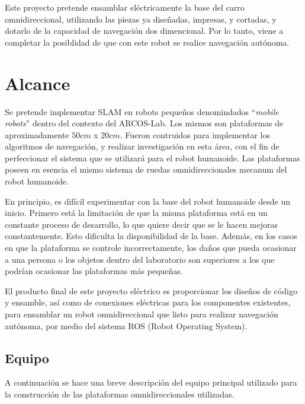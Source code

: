 Este proyecto pretende ensamblar eléctricamente la base del carro omnidireccional, utilizando las piezas ya diseñadas, impresas, y cortadas, y dotarlo de la capacidad de navegación dos dimencional. Por lo tanto, viene a completar la posiblidad de que con este robot se realice navegación autónoma.

\newpage
\section{Alcance}
Se pretende implementar SLAM en robots pequeños denomindados ``\textit{mobile robots}'' dentro del contexto del ARCOS-Lab. Los mismos son plataformas de aproximadamente $50cm$ x $20cm$. Fueron contruidos para implementar los algoritmos de navegación, y realizar investigación en esta área, con el fin de perfeccionar el sistema que se utilizará para el robot humanoide. Las plataformas poseen en esencia el mismo sistema de ruedas omnidireccionales mecanum del robot humanoide.

En principio, es difícil experimentar con la base del robot humanoide desde un inicio. Primero está la limitación de que la misma plataforma está en un constante proceso de desarrollo, lo que quiere decir que se le hacen mejoras constantemente. Esto dificulta la disponibilidad de la base. Además, en los casos en que la plataforma se controle incorrectamente, los daños que pueda ocasionar a una persona o los objetos dentro del laboratorio son superiores a los que podrían ocasionar las plataformas más pequeñas.

El producto final de este proyecto eléctrico es proporcionar los diseños de código y ensamble, así como de conexiones eléctricas para los componentes existentes, para ensamblar un robot omnidireccional que listo para realizar navegación autónoma, por medio del sistema ROS (Robot Operating System).

\subsection{Equipo}
A continuación se hace una breve descripción del equipo principal utilizado para la construcción de las plataformas omnidireccionales utilizadas.

